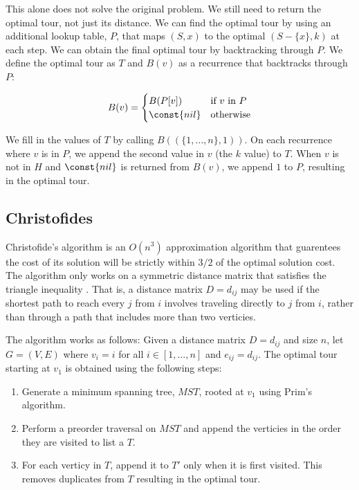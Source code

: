 \documentclass[11pt,fleqn]{article}
\begin{document}
This alone does not solve the original problem.  We still need to return 
the optimal tour, not just its distance.  We can find the optimal tour
by using an additional lookup table, $P$, that maps $(S, x)$ to the optimal
$(S-\{x\}, k)$ at each step.  We can obtain the final optimal tour by
backtracking through $P$.  We define the optimal tour as $T$ and $B(v)$ as a
recurrence that backtracks through $P$:

\begin{align*}
  B(v)=\begin{cases}
    B(P[v])     & \text{if } v \text{\ in\ } P \\
    \const{nil} & \text{otherwise} 
  \end{cases}
\end{align*}

We fill in the values of $T$ by calling $B((\{1,\dots,n\}, 1))$.  On each
recurrence where $v$ is in $P$, we append the second value in $v$ (the $k$
value) to $T$.  When $v$ is not in $H$ and $\const{nil}$ is returned
from $B(v)$, we append $1$ to $P$, resulting in the optimal tour.
\par

\subsection{Christofides}
Christofide's algorithm is an $O(n^3)$ approximation algorithm that guarentees
the cost of its solution will be strictly within $3/2$ of the optimal solution
cost.  The algorithm only works on a symmetric distance matrix that satisfies
the triangle inequality \cite{nicos}.  That is, a distance matrix $D=d_{ij}$
may be used if the shortest path to reach every $j$ from
$i$ involves traveling directly to $j$ from $i$, rather than through a path that
includes more than two verticies.
\par

The algorithm works as follows: Given a distance matrix $D=d_{ij}$ and size $n$,
let $G=(V,E)$ where $v_i=i$ for all $i\in [1,\dots,n]$ and $e_{ij}=d_{ij}$.  The
optimal tour starting at $v_1$ is obtained using the following steps:
\begin{enumerate}
  \item Generate a minimum spanning tree, $MST$, rooted at $v_1$ using Prim's algorithm.
  \item Perform a preorder traversal on $MST$ and append the verticies in the order they 
    are visited to list a $T$.
  \item For each verticy in $T$, append it to $T'$ only when it is first visited.  This 
    removes duplicates from $T$ resulting in the optimal tour.
\end{enumerate}
\end{document}
